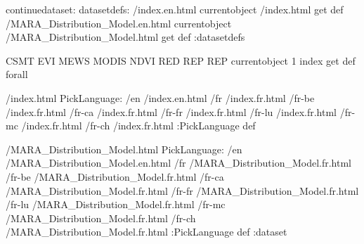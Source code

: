 \begin{ingrid}
continuedataset:
datasetdefs:
/index.en.html currentobject /index.html get def
/MARA_Distribution_Model.en.html currentobject /MARA_Distribution_Model.html get def
:datasetdefs

{ CSMT EVI MEWS MODIS NDVI RED REP REP } { currentobject 1 index get def } forall

/index.html {
PickLanguage:
/en /index.en.html
/fr /index.fr.html
/fr-be /index.fr.html
/fr-ca /index.fr.html
/fr-fr /index.fr.html
/fr-lu /index.fr.html
/fr-mc /index.fr.html
/fr-ch /index.fr.html
:PickLanguage
} def

/MARA_Distribution_Model.html {
PickLanguage:
/en /MARA_Distribution_Model.en.html
/fr /MARA_Distribution_Model.fr.html
/fr-be /MARA_Distribution_Model.fr.html
/fr-ca /MARA_Distribution_Model.fr.html
/fr-fr /MARA_Distribution_Model.fr.html
/fr-lu /MARA_Distribution_Model.fr.html
/fr-mc /MARA_Distribution_Model.fr.html
/fr-ch /MARA_Distribution_Model.fr.html
:PickLanguage
} def
:dataset
\end{ingrid}
